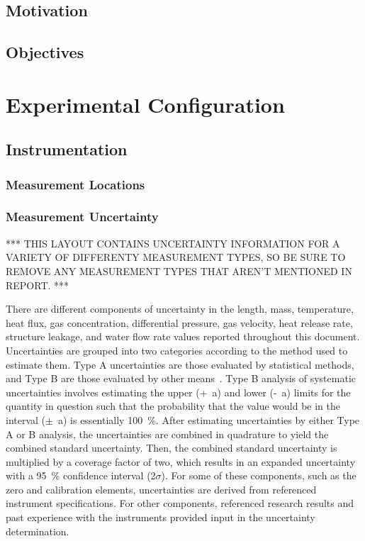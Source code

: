 \documentclass[12pt,oneside]{book}
\begin{document}
\section{Motivation}

\section{Objectives}


\chapter{Experimental Configuration}
\label{chap:exp_config}

\section{Instrumentation}
\label{sec:instrument}

\subsection{Measurement Locations}
\label{subsec:measure_locs}

\subsection{Measurement Uncertainty}
\label{subsec:uncertainty}

*** THIS LAYOUT CONTAINS UNCERTAINTY INFORMATION FOR A VARIETY OF DIFFERENTY MEASUREMENT TYPES, SO BE SURE TO REMOVE ANY MEASUREMENT TYPES THAT AREN'T MENTIONED IN REPORT. ***

There are different components of uncertainty in the length, mass, temperature, heat flux, gas concentration, differential pressure, gas velocity, heat release rate, structure leakage, and water flow rate values reported throughout this document. Uncertainties are grouped into two categories according to the method used to estimate them. Type A uncertainties are those evaluated by statistical methods, and Type B are those evaluated by other means~\cite{Taylor&Kuyatt:1994}. Type B analysis of systematic uncertainties involves estimating the upper (+~a) and lower (-~a) limits for the quantity in question such that the probability that the value would be in the interval ($\pm$~a) is essentially 100~\%. After estimating uncertainties by either Type A or B analysis, the uncertainties are combined in quadrature to yield the combined standard uncertainty. Then, the combined standard uncertainty is multiplied by a coverage factor of two, which results in an expanded uncertainty with a 95~\% confidence interval (2$\sigma$). For some of these components, such as the zero and calibration elements, uncertainties are derived from referenced instrument specifications. For other components, referenced research results and past experience with the instruments provided input in the uncertainty determination.
\end{document}
